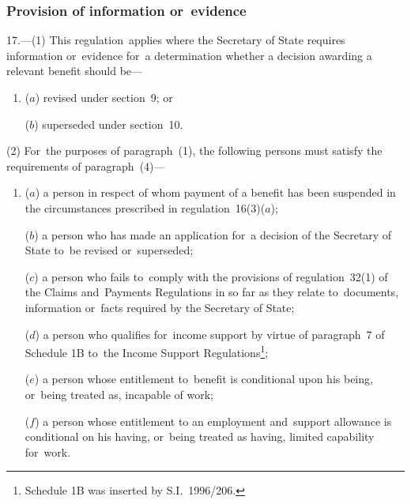 \documentclass[12pt,a4paper]{article}
\begin{document}

\subsubsection[17. Provision of information or~evidence]{Provision of information or~evidence}

17.—(1) This regulation~applies where the Secretary of State requires information or~evidence for~a determination whether a decision awarding a relevant benefit should be—
\begin{enumerate}\item[]
($a$) revised under section~9; or

($b$) superseded under section~10.
\end{enumerate}

(2) For~the purposes of paragraph~(1), the following persons must satisfy the requirements of paragraph~(4)—
\begin{enumerate}\item[]
($a$) a person in respect of whom payment of a benefit has been suspended in the circumstances prescribed in regulation~16(3)($a$);

($b$) a person who has made an application for~a decision of the Secretary of State to~be revised or~superseded;

($c$) a person who fails to~comply with the provisions of regulation~32(1) of the Claims and~Payments Regulations in so far as they relate to~documents, information or~facts required by the Secretary of State;

($d$) a person who qualifies for~income support by virtue of paragraph~7 of Schedule 1B to~the Income Support Regulations\footnote{\frenchspacing Schedule 1B was inserted by S.I.~1996/206.};

($e$) a person whose entitlement to~benefit is conditional upon his being, or~being treated as, incapable of work;

($f$) a person whose entitlement to an employment and~support allowance is conditional on his having, or~being treated as having, limited capability for~work.
\end{enumerate}
\end{document}
